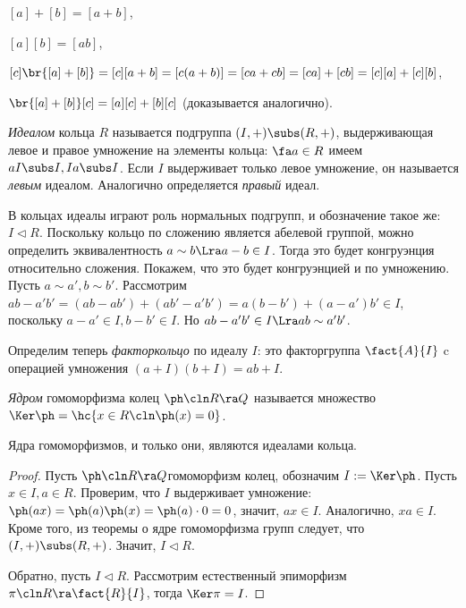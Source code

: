 \documentclass[a4paper]{article}
\newcommand{\kph}{\Ker \ph}
\begin{document}
 $[a]+[b]=[a+b]$,

 $[a][b]=[ab]$,

 $[c]\br{[a]+[b]}=[c][a+b]=[c(a+b)]=[ca+cb]=[ca]+[cb]=[c][a]+[c][b]$,

 $\br{[a]+[b]}[c]=[a][c]+[b][c]$ (доказывается аналогично).

\begin{df}
\emph{Идеалом} кольца $R$ называется подгруппа $(I,+) \subs (R,+)$,  выдерживающая левое и правое умножение
на элементы кольца: $\fa a \in R$ имеем $aI \subs I, Ia \subs I$. Если $I$ выдерживает только левое
умножение, он называется \emph{левым} идеалом. Аналогично определяется \emph{правый} идеал.
\end{df}

В кольцах идеалы играют роль нормальных подгрупп, и обозначение такое же:  $I \lhd R$. Поскольку кольцо по
сложению является абелевой группой, можно определить эквивалентность $a\sim b \Lra a - b \in I$. Тогда это
будет конгруэнция относительно сложения. Покажем, что это будет конгруэнцией и по умножению. Пусть $a \sim
a', b \sim b'$. Рассмотрим $ab-a'b'=(ab-ab')+(ab'-a'b')=a(b-b')+(a-a')b' \in I$, поскольку $a-a' \in I, b-b'
\in I$. Но $ab-a'b' \in I \Lra ab \sim a'b'$.

\begin{df}
Определим теперь \emph{факторкольцо} по идеалу $I$: это факторгруппа  $\fact{A}{I}$ c операцией умножения
$(a+I)(b+I)= ab + I$.
\end{df}

\begin{df}
\emph{Ядром} гомоморфизма колец $\ph\cln R \ra Q$ называется множество $\kph = \hc{x \in R\cln \ph(x)=0}$.
\end{df}

\begin{theorem}
Ядра гомоморфизмов, и только они, являются идеалами кольца.
\end{theorem}
\begin{proof}
 Пусть $\ph\cln R \ra Q$\т гомоморфизм колец, обозначим $I := \kph$.  Пусть $x \in I, a \in R$. Проверим,
что $I$ выдерживает умножение: $\ph(ax)=\ph(a)\ph(x)=\ph(a)\cdot 0=0$, значит, $ax \in I$. Аналогично, $xa
\in I$. Кроме того, из теоремы о ядре гомоморфизма групп следует, что $(I,+) \subs (R, +)$. Значит, $I \lhd
R$.

 Обратно, пусть $I \lhd R$. Рассмотрим естественный эпиморфизм  $\pi\cln R \ra \fact{R}{I}$, тогда
$\Ker \pi = I$.
\end{proof}
\end{document}
